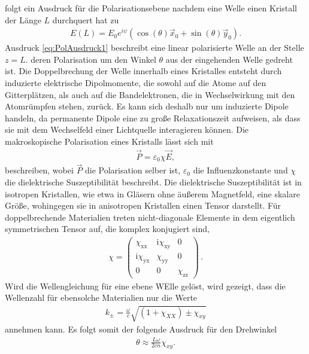 folgt ein Ausdruck für die Polarisationsebene nachdem eine Welle einen Kristall der Länge $L$ durchquert hat zu
\begin{align}
    \label{eq:PolAusdruck1}
    E(L)=E_0e^{i\psi}(\cos(\theta)\vec x_0+\sin(\theta)\vec y_0).
\end{align}
Ausdruck \eqref{eq:PolAusdruck1} beschreibt eine linear polarisierte Welle an der Stelle $z=L$. deren Polarisation um den Winkel $\theta$ aus der eingehenden Welle gedreht ist.
Die Doppelbrechung der Welle innerhalb eines Kristalles entsteht durch induzierte elektrische Dipolmomente, die sowohl auf die Atome auf den Gitterplätzen, als auch auf die 
Bandelektronen, die in Wechselwirkung mit den Atomrümpfen stehen, zurück. Es kann sich deshalb nur um induzierte Dipole handeln, da permanente Dipole eine zu große Relaxationszeit 
aufweisen, als dass sie mit dem Wechselfeld einer Lichtquelle interagieren können. 
Die makroskopische Polarisation eines Kristalls lässt sich mit
\begin{align}
    \vec P=\varepsilon_0\chi\vec E,
\end{align}
beschreiben, wobei $\vec P$ die Polarisation selber ist, $\varepsilon_0$ die Influenzkonstante und $\chi$ die dielektrische Suszeptibilität beschreibt. Die dielektrische Suszeptibilität
ist in isotropen Kristallen, wie etwa in Gläsern ohne äußerem Magnetfeld, eine skalare Größe, wohingegen sie in anisotropen Kristallen einen Tensor darstellt. Für doppelbrechende
Materialien treten nicht-diagonale Elemente in dem eigentlich symmetrischen Tensor auf, die komplex konjugiert sind,
\begin{align}
    \chi=
  \left( {\begin{array}{ccc}
   \chi_\text{xx} & \text{i}\chi_\text{xy} & 0\\
   \text{i}\chi_\text{yx} & \chi_\text{yy} & 0\\
   0 & 0 &\chi_\text{zz}
  \end{array} } \right)\,.
\end{align}
Wird die Wellengleichung für eine ebene WElle gelöst, wird gezeigt, dass die Wellenzahl für ebensolche Materialien nur die Werte
\begin{align}
    k_\pm =\frac\omega c\sqrt{(1+\chi_{XX})\pm\chi_{xy}}
\end{align}
annehmen kann. Es folgt somit der folgende Ausdruck für den Drehwinkel
\begin{align}
    \theta\approx \frac{L\omega}{2cn}\chi_{xy}.
\end{align}

